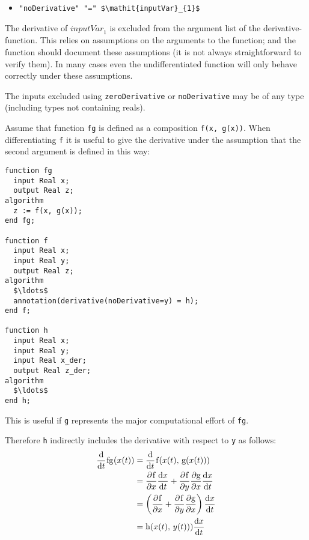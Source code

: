 \begin{itemize}
\item
  {\lstinline[language=grammar]!"noDerivative" "=" $\mathit{inputVar}_{1}$!}
\end{itemize}

The derivative of $\mathit{inputVar}_{1}$ is excluded from the argument list of the derivative-function.
This relies on assumptions on the arguments to the function; and the function should document these assumptions (it is not always straightforward to verify them).
In many cases even the undifferentiated function will only behave correctly under these assumptions.

The inputs excluded using {\lstinline!zeroDerivative!} or {\lstinline!noDerivative!} may be of any type (including types not containing reals).

\begin{nonnormative}
Assume that function {\lstinline!fg!} is defined as a composition {\lstinline!f(x, g(x))!}.
When differentiating {\lstinline!f!} it is useful to give the derivative under the assumption that the second argument is defined in this way:
\begin{lstlisting}[language=modelica]
function fg
  input Real x;
  output Real z;
algorithm
  z := f(x, g(x));
end fg;

function f
  input Real x;
  input Real y;
  output Real z;
algorithm
  $\ldots$
  annotation(derivative(noDerivative=y) = h);
end f;

function h
  input Real x;
  input Real y;
  input Real x_der;
  output Real z_der;
algorithm
  $\ldots$
end h;
\end{lstlisting}
This is useful if {\lstinline!g!} represents the major computational effort of {\lstinline!fg!}.

Therefore {\lstinline!h!} indirectly includes the derivative with respect to {\lstinline!y!} as follows:
\begin{equation*}
\begin{aligned}
\udfrac{}{t}\text{{\lstinline!fg!}}(x(t))
&= \udfrac{}{t}\text{{\lstinline!f!}}(x(t),\, \text{{\lstinline!g!}}(x(t)))\\
&= \pdfrac{\text{{\lstinline!f!}}}{x} \udfrac{x}{t} + \pdfrac{\text{{\lstinline!f!}}}{y} \pdfrac{\text{{\lstinline!g!}}}{x} \udfrac{x}{t}\\
&= \left(\pdfrac{\text{{\lstinline!f!}}}{x} + \pdfrac{\text{{\lstinline!f!}}}{y} \pdfrac{\text{{\lstinline!g!}}}{x} \right) \udfrac{x}{t}\\
&= \text{{\lstinline!h!}}(x(t),\, y(t))) \udfrac{x}{t}
\end{aligned}
\end{equation*}
\end{nonnormative}


